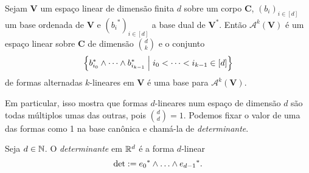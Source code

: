 


\begin{proposition}
Sejam $\bm V$ um espaço linear de dimensão finita $d$ sobre um corpo $\bm C$, $(b_i)_{i \in [d]}$ um base ordenada de $\bm V$ e $({b_i}^*)_{i \in [d]}$ a base dual de $\bm{V^*}$. Então $\mathcal{A}^k(\bm V)$ é um espaço linear sobre $\bm C$ de dimensão $\binom{d}{k}$ e o conjunto
	\begin{equation*}
	\left\{{b_{i_0}^* \wedge \cdots \wedge b_{i_{k-1}}^*}\;\middle\vert\;{i_0 < \cdots < i_{k-1} \in [d]}\right\}
	\end{equation*}
de formas alternadas $k$-lineares em $\bm V$ é uma base para $\mathcal{A}^k(\bm V)$.
\end{proposition}

Em particular, isso mostra que formas $d$-lineares num espaço de dimensão $d$ são todas múltiplos umas das outras, pois $\binom{d}{d}=1$. Podemos fixar o valor de uma das formas como 1 na base canônica e chamá-la de \emph{determinante}.

\begin{definition}
Seja $d \in \mathbb{N}$. O \emph{determinante} em $\mathbb{R}^d$ é a forma $d$-linear
	\begin{equation*}
	\det := {e_0}^* \wedge \ldots \wedge {e_{d-1}}^*.
	\end{equation*}
\end{definition}

